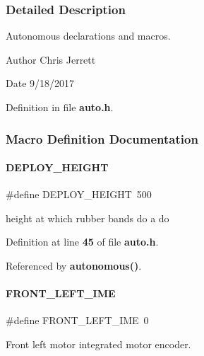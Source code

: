 \subsubsection{Detailed Description}
Autonomous declarations and macros. 

\begin{DoxyAuthor}{Author}
Chris Jerrett 
\end{DoxyAuthor}
\begin{DoxyDate}{Date}
9/18/2017 
\end{DoxyDate}


Definition in file \textbf{ auto.\+h}.



\subsubsection{Macro Definition Documentation}
\mbox{\label{auto_8h_afe2ab4383f3cf46d67e74834f691976f}} 
\paragraph{D\+E\+P\+L\+O\+Y\+\_\+\+H\+E\+I\+G\+HT}
{\footnotesize\ttfamily \#define D\+E\+P\+L\+O\+Y\+\_\+\+H\+E\+I\+G\+HT~500}



height at which rubber bands do a do 



Definition at line \textbf{ 45} of file \textbf{ auto.\+h}.



Referenced by \textbf{ autonomous()}.

\mbox{\label{auto_8h_a7bc3203ebc61f8414788156a8616047c}} 
\paragraph{F\+R\+O\+N\+T\+\_\+\+L\+E\+F\+T\+\_\+\+I\+ME}
{\footnotesize\ttfamily \#define F\+R\+O\+N\+T\+\_\+\+L\+E\+F\+T\+\_\+\+I\+ME~0}



Front left motor integrated motor encoder. 



